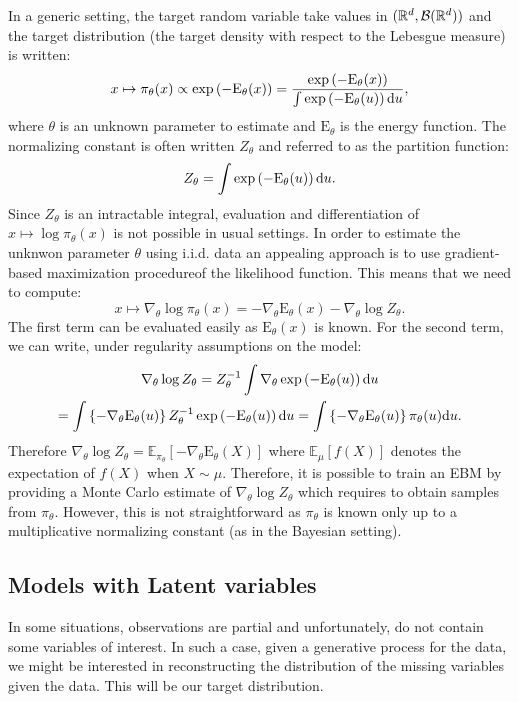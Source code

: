 \documentclass[english,graybox,envcountchap,envcountsame,sectrefs,shortlabels]{svmono}
\theoremstyle{style}
\begin{document}
In a generic setting, the target random variable take values in $(\mathbb{R}^d,\mathcal{B}(\mathbb{R}^d))$ and the target distribution (the target density with respect to the Lebesgue measure) is written:
$$
x\mapsto \pi_\theta(x) \propto \exp\left(-\mathrm{E}_\theta(x)\right) = \frac{\exp\left(-\mathrm{E}_\theta(x)\right)}{\int \exp\left(-\mathrm{E}_\theta(u)\right)\mathrm{d} u},
$$
where $\theta$ is an unknown parameter to estimate and $\mathrm{E}_\theta$ is the energy function. The normalizing constant is often written $Z_\theta$ and referred to as the partition function:
$$
Z_\theta = \int \exp\left(-\mathrm{E}_\theta(u)\right)\mathrm{d} u.
$$
Since $Z_\theta$ is an intractable integral, evaluation and
differentiation of $x\mapsto \log \pi_\theta(x)$ is not possible in usual settings. In order to estimate the unknwon parameter $\theta$ using i.i.d. data an appealing approach is to use gradient-based maximization procedureof the likelihood function. This means that we need to compute:
$$
x\mapsto \nabla_\theta \log\pi_\theta(x) = -\nabla_\theta\mathrm{E}_\theta(x) - \nabla_\theta \log Z_\theta.
$$
The first term can be evaluated easily as $\mathrm{E}_\theta(x)$ is known. For the second term, we can write, under regularity assumptions on the model:
\begin{multline*}
\nabla_\theta \log Z_\theta = Z_\theta^{-1} \int \nabla_\theta\exp\left(-\mathrm{E}_\theta(u)\right)\mathrm{d} u \\=  \int \left\{-\nabla_\theta \mathrm{E}_\theta(u)\right\}Z_\theta^{-1}\exp\left(-\mathrm{E}_\theta(u)\right)\mathrm{d} u = \int \left\{-\nabla_\theta \mathrm{E}_\theta(u)\right\}\pi_\theta(u)\mathrm{d} u .
\end{multline*}
Therefore $\nabla_\theta \log Z_\theta = \mathbb{E}_{\pi_\theta}[-\nabla_\theta \mathrm{E}_\theta(X)]$ where $\mathbb{E}_{\mu}[f(X)]$ denotes the expectation of $f(X)$ when $X\sim \mu$. Therefore, it is possible to train an EBM by providing a Monte Carlo estimate of $\nabla_\theta \log Z_\theta$ which requires to obtain samples from $\pi_\theta$. However, this is not straightforward as $\pi_\theta$ is known only up to a multiplicative normalizing constant (as in the Bayesian setting).
%


\subsection{Models with Latent variables}
In some situations, observations are partial and unfortunately, do not contain some variables of interest. In such a case, given a generative process for the data, we might be interested in reconstructing the distribution of the missing variables given the data. This will be our target distribution. 
\end{document}
